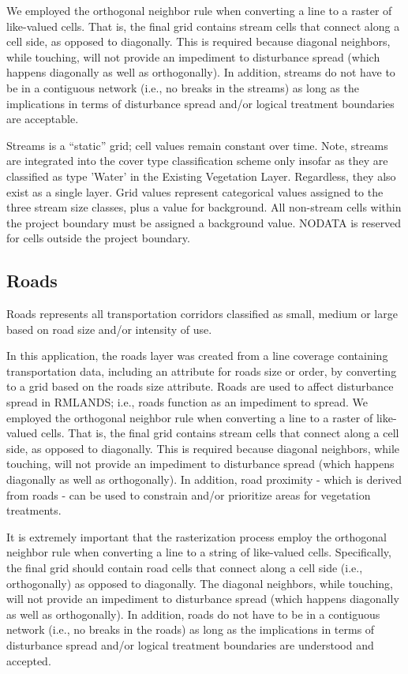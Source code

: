 We employed the orthogonal neighbor rule when converting a line to a raster of like-valued cells. That is, the final grid contains stream cells that connect along a cell side, as opposed to diagonally. This is required because diagonal neighbors, while touching, will not provide an impediment to disturbance spread (which happens diagonally as well as orthogonally). In addition, streams do not have to be in a contiguous network (i.e., no breaks in the streams) as long as the implications in terms of disturbance spread and/or logical treatment boundaries are acceptable. 

Streams is a ``static'' grid; cell values remain constant over time. Note, streams are integrated into the cover type classification scheme only insofar as they are classified as type 'Water' in the Existing Vegetation Layer. Regardless, they also exist as a single layer. Grid values represent categorical values assigned to the three stream size classes, plus a value for background. All non-stream cells within the project boundary must be assigned a background value. NODATA is reserved for cells outside the project boundary. 

\subsection{Roads} 
Roads represents all transportation corridors classified as small, medium or large based on road size and/or intensity of use. 

In this application, the roads layer was created from a line coverage containing transportation data, including an attribute for roads size or order, by converting to a grid based on the roads size attribute. Roads are used to affect disturbance spread in RMLANDS; i.e., roads function as an impediment to spread. We employed the orthogonal neighbor rule when converting a line to a raster of like-valued cells. That is, the final grid contains stream cells that connect along a cell side, as opposed to diagonally. This is required because diagonal neighbors, while touching, will not provide an impediment to disturbance spread (which happens diagonally as well as orthogonally). In addition, road proximity - which is derived from roads - can be used to constrain and/or prioritize areas for vegetation treatments. 

It is extremely important that the rasterization process employ the orthogonal neighbor rule when converting a line to a string of like-valued cells. Specifically, the final grid should contain road cells that connect along a cell side (i.e., orthogonally) as opposed to diagonally. The diagonal neighbors, while touching, will not provide an impediment to disturbance spread (which happens diagonally as well as orthogonally). In addition, roads do not have to be in a contiguous network (i.e., no breaks in the roads) as long as the implications in terms of disturbance spread and/or logical treatment boundaries are understood and accepted. 

